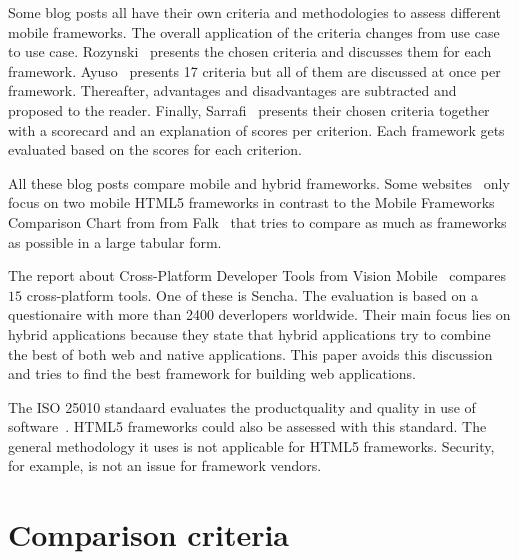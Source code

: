 \documentclass[a4paper]{artikel3}
\begin{document}
Some blog posts \cite{Sarrafi2012a,Ayuso2012,Rozynski2011} all have their own criteria and methodologies to assess different mobile frameworks.  
The overall application of the criteria changes from use case to use case.  
Rozynski~\cite{Rozynski2011} presents the chosen criteria and discusses them for each framework.  
Ayuso~\cite{Ayuso2012} presents 17 criteria but all of them are discussed at once per framework.  
Thereafter,  advantages and disadvantages are subtracted and proposed to the reader.  
Finally, Sarrafi~\cite{Sarrafi2012a} presents their chosen criteria together with a scorecard and an explanation of scores per criterion.  
Each framework gets evaluated based on the scores for each criterion.

All these blog posts compare mobile and hybrid frameworks.  
Some websites~\cite{Bristowe2012,Burris} only focus on two mobile HTML5 frameworks in contrast to the Mobile Frameworks Comparison Chart from from Falk~\cite{Falk2011} that tries to compare as much as frameworks as possible in a large tabular form.

The report about Cross-Platform Developer Tools from Vision Mobile~\cite{Mobile2012} compares $15$ cross-platform tools.
One of these is Sencha.
The evaluation is based on a questionaire with more than 2400 deverlopers worldwide.
Their main focus lies on hybrid applications because they state that hybrid applications try to combine the best of both web and native applications.
This paper avoids this discussion and tries to find the best framework for building web applications.

The ISO 25010 standaard evaluates the productquality and quality in use of software~\cite{Standard2010}.
HTML5 frameworks could also be assessed with this standard.
The general methodology it uses is not applicable for HTML5 frameworks.
Security,  for example,  is not an issue for framework vendors.



\section{Comparison criteria} %
\label{sec:comparisoncriteria}

\end{document}

